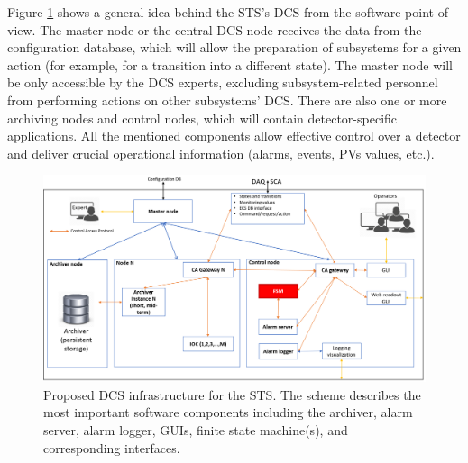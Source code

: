 Figure \ref{fig_arch} shows a general idea behind the \gls{STS}'s \gls{DCS} from the software point of view.  The master node or the central \gls{DCS} node receives the data from the configuration database, which will allow the preparation of subsystems for a given action (for example, for a transition into a different state). The master node will be only accessible by the \gls{DCS} experts, excluding subsystem-related personnel from performing actions on other subsystems' \gls{DCS}. There are also one or more archiving nodes and control nodes, which will contain detector-specific applications. All the mentioned components allow effective control over a detector and deliver crucial operational information (alarms, events, \glspl{PV} values, etc.). 

\begin{figure}[!h]
\centering
\includegraphics[width=1\columnwidth]{Chapter3/Controls/images/DCS.png}
\caption{Proposed \gls{DCS} infrastructure for the \gls{STS}. The scheme describes the most important software components including the archiver, alarm server, alarm logger, GUIs, finite state machine(s), and corresponding interfaces.}
\label{fig_arch}
\end{figure}
\newpage





